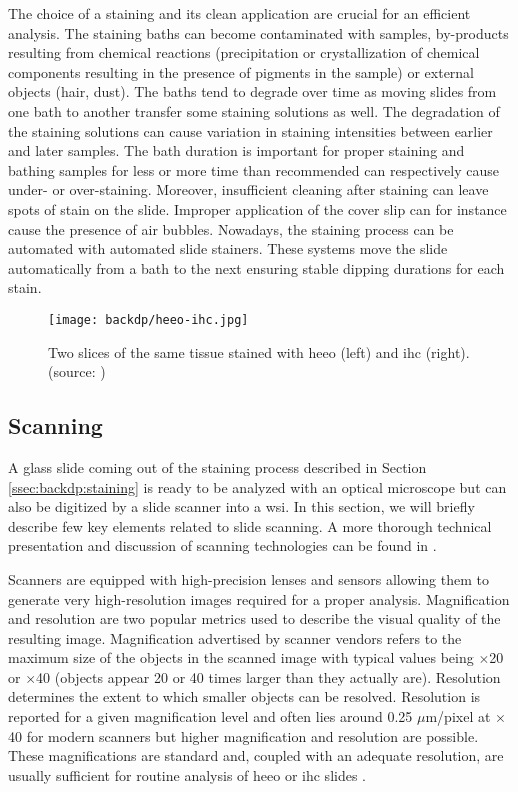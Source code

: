 The choice of a staining and its clean application are crucial for an efficient analysis. The staining baths can become contaminated with samples, by-products resulting from chemical reactions (\eg precipitation or crystallization of chemical components resulting in the presence of pigments in the sample) or external objects (\eg hair, dust). The baths tend to degrade over time as moving slides from one bath to another transfer some staining solutions as well. The degradation of the staining solutions can cause variation in staining intensities between earlier and later samples. The bath duration is important for proper staining and bathing samples for less or more time than recommended can respectively cause under- or over-staining. Moreover, insufficient cleaning after staining can leave spots of stain on the slide. Improper application of the cover slip can for instance cause the presence of air bubbles. Nowadays, the staining process can be automated with automated slide stainers. These systems move the slide automatically from a bath to the next ensuring stable dipping durations for each stain.

\begin{figure}
  \centering
  \texttt{[image: backdp/heeo-ihc.jpg]}
  \caption{Two slices of the same tissue stained with \acrshort{heeo} (left) and \acrshort{ihc} (right). \\(source: \cite{litjens2018camelyon})}
  \label{fig:backdp:heeo-ihc}
\end{figure}

\subsection{Scanning}
\label{ssec:backdp:scanning}

A glass slide coming out of the staining process described in Section \ref{ssec:backdp:staining} is ready to be analyzed with an optical microscope but can also be digitized by a slide scanner into a \acrshort{wsi}. In this section, we will briefly describe few key elements related to slide scanning. A more thorough technical presentation and discussion of scanning technologies can be found in \cite{patel2021contemporary}. 

Scanners are equipped with high-precision lenses and sensors allowing them to generate very high-resolution images required for a proper analysis. Magnification and resolution are two popular metrics used to describe the visual quality of the resulting image. Magnification advertised by scanner vendors refers to the maximum size of the objects in the scanned image with typical values being $\times$20 or $\times$40 (\ie objects appear 20 or 40 times larger than they actually are). Resolution determines the extent to which smaller objects can be resolved. Resolution is reported for a given magnification level and often lies around 0.25 $\mu$m/pixel at $\times$40 for modern scanners but higher magnification and resolution are possible. These magnifications are standard and, coupled with an adequate resolution, are usually sufficient for routine analysis of \acrshort{heeo} or \acrshort{ihc} slides \cite{zarella2019practical}.

